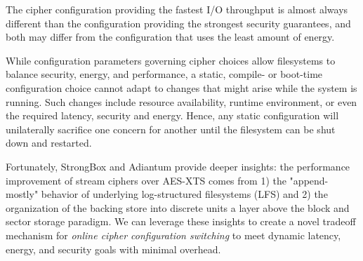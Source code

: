 The cipher configuration providing the fastest I/O throughput is almost always
different than the configuration providing the strongest security guarantees,
and both may differ from the configuration that uses the least amount of energy.

While configuration parameters governing cipher choices allow filesystems to balance security, energy,
and performance, a static,  compile- or boot-time configuration choice cannot
adapt to changes that might arise while the system is running.  Such changes include resource
availability, runtime environment, or even the required latency, security and
energy. Hence, any static configuration will unilaterally sacrifice one concern
for another until the filesystem can be shut down and restarted.

Fortunately, StrongBox and Adiantum provide deeper insights: the performance
improvement of stream ciphers over AES-XTS comes from 1) the "append-mostly"
behavior of underlying log-structured filesystems (LFS) and 2) the organization
of the backing store into discrete units a layer above the block and sector
storage paradigm. We can leverage these insights to create a novel tradeoff
mechanism for \emph{online cipher configuration switching} to meet dynamic
latency, energy, and security goals with minimal overhead.



